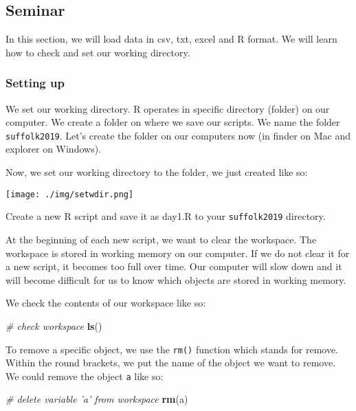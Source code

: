 \documentclass[]{article}
\newenvironment{Shaded}{\begin{snugshade}}{\end{snugshade}}
\newcommand{\CommentTok}[1]{\textcolor[rgb]{0.56,0.35,0.01}{\textit{#1}}}
\newcommand{\KeywordTok}[1]{\textcolor[rgb]{0.13,0.29,0.53}{\textbf{#1}}}
\newcommand{\NormalTok}[1]{#1}
\begin{document}
\hypertarget{seminar-1}{%
\subsection{Seminar}\label{seminar-1}}

In this section, we will load data in csv, txt, excel and R format. We will learn how to check and set our working directory.

\hypertarget{setting-up}{%
\subsubsection{Setting up}\label{setting-up}}

We set our working directory. R operates in specific directory (folder) on our computer. We create a folder on where we save our scripts. We name the folder \texttt{suffolk2019}. Let's create the folder on our computers now (in finder on Mac and explorer on Windows).

Now, we set our working directory to the folder, we just created like so:

\texttt{[image: ./img/setwdir.png]}

Create a new R script and save it as day1.R to your \texttt{suffolk2019} directory.

At the beginning of each new script, we want to clear the workspace. The workspace is stored in working memory on our computer. If we do not clear it for a new script, it becomes too full over time. Our computer will slow down and it will become difficult for us to know which objects are stored in working memory.

We check the contents of our workspace like so:

\begin{Shaded}
\begin{Highlighting}[]
\CommentTok{# check workspace}
\KeywordTok{ls}\NormalTok{()}
\end{Highlighting}
\end{Shaded}

To remove a specific object, we use the \texttt{rm()} function which stands for remove. Within the round brackets, we put the name of the object we want to remove. We could remove the object \texttt{a} like so:

\begin{Shaded}
\begin{Highlighting}[]
\CommentTok{# delete variable 'a' from workspace}
\KeywordTok{rm}\NormalTok{(a)}
\end{Highlighting}
\end{Shaded}
\end{document}

